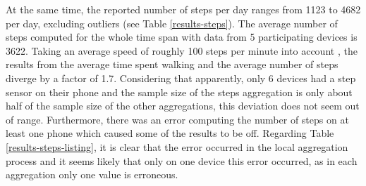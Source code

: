At the same time, the reported number of steps per day ranges from 1123 to 4682 per day, excluding outliers (see Table \ref{results-steps}). The average number of steps computed for the whole time span with data from 5 participating devices is 3622. Taking an average speed of roughly 100 steps per minute into account \parencite{steps2}, the results from the average time spent walking and the average number of steps diverge by a factor of 1.7. Considering that apparently, only 6 devices had a step sensor on their phone and the sample size of the steps aggregation is only about half of the sample size of the other aggregations, this deviation does not seem out of range. Furthermore, there was an error computing the number of steps on at least one phone which caused some of the results to be off. Regarding Table \ref{results-steps-listing}, it is clear that the error occurred in the local aggregation process and it seems likely that only on one device this error occurred, as in each aggregation only one value is erroneous.

